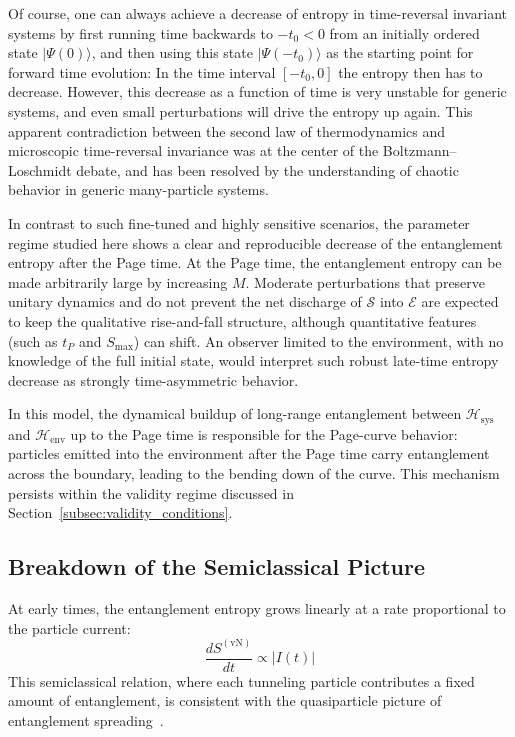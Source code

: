 \documentclass[12pt,oneside,openright]{report}
\theoremstyle{definition}
\theoremstyle{plain}
\theoremstyle{remark}
\begin{document}
Of course, one can always achieve a decrease of entropy in time-reversal invariant systems by first running time backwards to $-t_0 < 0$ from an initially ordered state $|\Psi(0)\rangle$, and then using this state $|\Psi(-t_0)\rangle$ as the starting point for forward time evolution: In the time interval $[-t_0, 0]$ the entropy then has to decrease. However, this decrease as a function of time is very unstable for generic systems, and even small perturbations will drive the entropy up again. This apparent contradiction between the second law of thermodynamics and microscopic time-reversal invariance was at the center of the Boltzmann--Loschmidt debate, and has been resolved by the understanding of chaotic behavior in generic many-particle systems.

In contrast to such fine-tuned and highly sensitive scenarios, the parameter regime studied here shows a clear and reproducible decrease of the entanglement entropy after the Page time. At the Page time, the entanglement entropy can be made arbitrarily large by increasing $M$. Moderate perturbations that preserve unitary dynamics and do not prevent the net discharge of $\mathcal{S}$ into $\mathcal{E}$ are expected to keep the qualitative rise-and-fall structure, although quantitative features (such as $t_P$ and $S_{\max}$) can shift. An observer limited to the environment, with no knowledge of the full initial state, would interpret such robust late-time entropy decrease as strongly time-asymmetric behavior.

In this model, the dynamical buildup of long-range entanglement between $\mathcal{H}_{\mathrm{sys}}$ and $\mathcal{H}_{\mathrm{env}}$ up to the Page time is responsible for the Page-curve behavior: particles emitted into the environment after the Page time carry entanglement across the boundary, leading to the bending down of the curve. This mechanism persists within the validity regime discussed in Section~\ref{subsec:validity_conditions}.

\subsection{Breakdown of the Semiclassical Picture}
At early times, the entanglement entropy grows linearly at a rate proportional to the particle current:
\begin{equation}
\frac{dS^{(\mathrm{vN})}}{dt} \propto |I(t)|
\label{eq:semiclassical_relation}
\end{equation}
This semiclassical relation, where each tunneling particle contributes a fixed amount of entanglement, is consistent with the quasiparticle picture of entanglement spreading~\cite{Calabrese_2005}.
\end{document}
